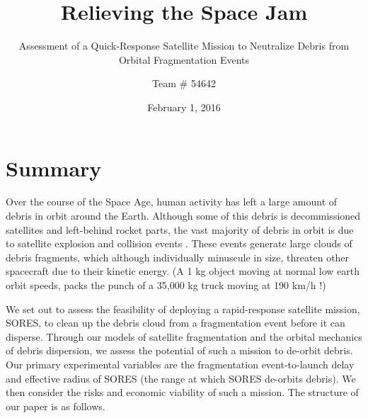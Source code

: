 \documentclass[12pt]{scrartcl}
\title{Relieving the Space Jam}
\subtitle{Assessment of a Quick-Response Satellite Mission to Neutralize Debris from Orbital Fragmentation Events}
\author{Team \# 54642}
\date{February 1, 2016}
\begin{document}
\maketitle

\newpage


\tableofcontents
\newpage


\section{Summary}

Over the course of the Space Age, human activity has left a large amount of debris in orbit around the Earth. Although some of this debris is decommissioned satellites and left-behind rocket parts, the vast majority of debris in orbit is due to satellite explosion and collision events \cite{ODPO}. These events generate large clouds of debris fragments, which although individually minuscule in size, threaten other spacecraft due to their kinetic energy. (A 1 kg object moving at normal low earth orbit speeds, packs the punch of a 35,000 kg truck moving at 190 km/h \cite{punch}!) \par
We set out to assess the feasibility of deploying a rapid-response satellite mission, SORES, to clean up the debris cloud from a fragmentation event before it can disperse. Through our models of satellite fragmentation and the orbital mechanics of debris dispersion, we assess the potential of such a mission to de-orbit debris. Our primary experimental variables are the fragmentation event-to-launch delay and effective radius of SORES (the range at which SORES de-orbits debris). We then consider the risks and economic viability of such a mission. The structure of our paper is as follows.
\end{document}
